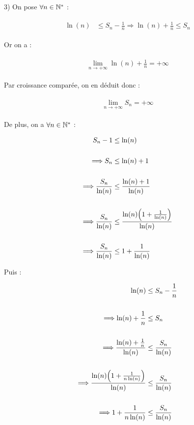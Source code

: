 \documentclass{article}
\begin{document}
\bigskip
\bigskip
\bigskip

3) On pose $\forall n\in\mathbb{N}^*$ :

\begin{align}
\begin{split}
\ln(n)&\leq S_n-\frac{1}{n} \Longrightarrow \ln(n)+\frac{1}{n}\leq S_n
\end{split}
\end{align}

\bigskip

Or on a :

\begin{align}
\begin{split}
\lim_{n\rightarrow+\infty}\ln(n)+\frac{1}{n}=+\infty
\end{split}
\end{align}

Par croissance comparée, on en déduit donc :

\begin{align}
\begin{split}
\boxed{\lim_{n\rightarrow+\infty}S_n=+\infty}
\end{split}
\end{align}

\bigskip
\bigskip
\bigskip

De plus, on a $\forall n\in\mathbb{N}^*$ :

\begin{align}
\begin{split}
S_n-1&\leq \ln(n)\\\\
\Longrightarrow S_n&\leq \ln(n)+1\\\\
\Longrightarrow \frac{S_n}{\ln(n)}&\leq \frac{\ln(n)+1}{\ln(n)}\\\\
\Longrightarrow \frac{S_n}{\ln(n)}&\leq \frac{\ln(n)\Bigl(1+\frac{1}{\ln(n)}\Bigl)}{\ln(n)}\\\\
\Longrightarrow \frac{S_n}{\ln(n)}&\leq 1+\frac{1}{\ln(n)}
\end{split}
\end{align}

\bigskip

Puis :

\bigskip

\begin{align}
\begin{split}
\ln(n)&\leq S_n-\frac{1}{n}\\\\
\Longrightarrow \ln(n)+\frac{1}{n}&\leq S_n\\\\
\Longrightarrow \frac{\ln(n)+\frac{1}{n}}{\ln(n)}&\leq\frac{S_n}{\ln(n)}\\\\
\Longrightarrow \frac{\ln(n)\Bigl(1+\frac{1}{n\ln(n)}\Bigl)}{\ln(n)}&\leq\frac{S_n}{\ln(n)}\\\\
\Longrightarrow 1+\frac{1}{n\ln(n)}&\leq\frac{S_n}{\ln(n)}
\end{split}
\end{align}
\end{document}
